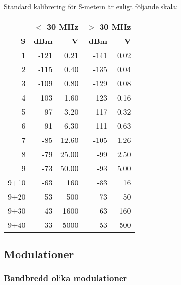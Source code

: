 Standard kalibrering för S-metern är enligt följande skala:

\begin{center}
\begin{longtable}{r|rr|rr}
	     & \multicolumn{2}{c|}{\textbf{$<$ 30 MHz}} & \multicolumn{2}{c}{\textbf{$>$ 30 MHz}} \\ 
	   \textbf{S} &  \textbf{dBm} &                \textbf{\textmu V} &  \textbf{dBm} &               \textbf{\textmu V} \\ \hline \endhead
	   1 & -121 &                     0.21 & -141 &                    0.02 \\
	   2 & -115 &                     0.40 & -135 &                    0.04 \\
	   3 & -109 &                     0.80 & -129 &                    0.08 \\
	   4 & -103 &                     1.60 & -123 &                    0.16 \\
	   5 &  -97 &                     3.20 & -117 &                    0.32 \\
	   6 &  -91 &                     6.30 & -111 &                    0.63 \\
	   7 &  -85 &                    12.60 & -105 &                    1.26 \\
	   8 &  -79 &                    25.00 &  -99 &                    2.50 \\
	   9 &  -73 &                    50.00 &  -93 &                    5.00 \\
	9+10 &  -63 &                      160 &  -83 &                      16 \\
	9+20 &  -53 &                      500 &  -73 &                      50 \\
	9+30 &  -43 &                     1600 &  -63 &                     160 \\
	9+40 &  -33 &                     5000 &  -53 &                     500
\end{longtable}
\end{center}

\subsection{Modulationer}

\subsubsection{Bandbredd olika modulationer}

